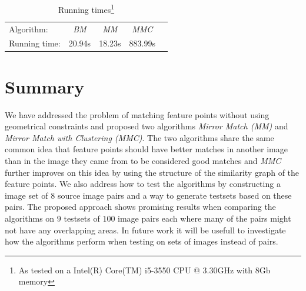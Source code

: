 \documentclass{article}
\begin{document}
\begin{savenotes}
\begin{table}
	\centering
	\small
\begin{tabular}{l*{4}{c}}
	Algorithm: & \emph{BM} & \emph{MM} & \emph{MMC} \\
	\noalign{\smallskip} 
	Running time: & 20.94s & 18.23s & 883.99s \\
\end{tabular}
\caption{Running times\footnote{As tested on a Intel(R) Core(TM) i5-3550 
CPU @ 3.30GHz with 8Gb memory}}
\label{table:running_times}
\end{table}
\end{savenotes}

\section{Summary}
We have addressed the problem of matching feature points without using 
geometrical constraints and proposed two algorithms \emph{Mirror Match 
(MM)} and \emph{Mirror Match with Clustering (MMC)}. The two algorithms 
share the same common idea that feature points should have better 
matches in another image than in the image they came from to be 
considered good matches and \emph{MMC} further improves on this idea by 
using the structure of the similarity graph of the feature points. We 
also address how to test the algorithms by constructing a image set of 
$8$ source image pairs and a way to generate testsets based on these 
pairs. The proposed approach shows promising results when comparing the 
algorithms on $9$ testsets of $100$ image pairs each where many of the 
pairs might not have any overlapping areas. In future work it will be 
usefull to investigate how the algorithms perform when testing on sets 
of images instead of pairs.



\end{document}
